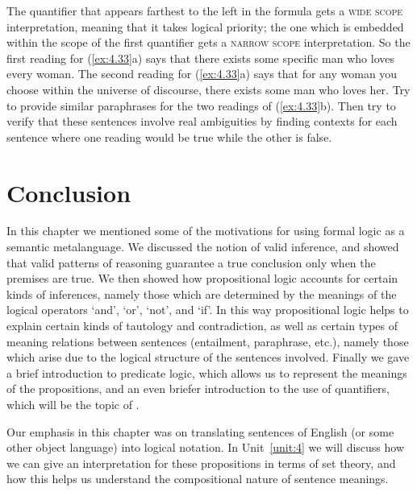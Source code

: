 The quantifier that appears farthest to the left in the formula gets a \textsc{wide scope} interpretation, meaning that it takes logical priority; the one which is embedded within the scope of the first quantifier gets a \textsc{narrow scope} interpretation. So the first reading for (\ref{ex:4.33}a) says that there exists some specific man who loves every woman. The second reading for (\ref{ex:4.33}a) says that for any woman you choose within the universe of discourse, there exists some man who loves her. Try to provide similar paraphrases for the two readings of (\ref{ex:4.33}b). Then try to verify that these sentences involve real ambiguities by finding contexts for each sentence where one reading would be true while the other is false.


\section{Conclusion}\label{sec:4.5}

In this chapter we mentioned some of the motivations for using formal logic as a semantic metalanguage. We discussed the notion of valid inference, and showed that valid patterns of reasoning guarantee a true conclusion only when the premises are true. We then showed how propositional logic accounts for certain kinds of inferences, namely those which are determined by the meanings of the logical operators ‘and’, ‘or’, ‘not’, and ‘if’. In this way propositional logic helps to explain certain kinds of tautology and contradiction, as well as certain types of meaning relations between sentences (entailment, paraphrase, etc.), namely those which arise due to the logical structure of the sentences involved. Finally we gave a brief introduction to predicate logic, which allows us to represent the meanings of the propositions, and an even briefer introduction to the use of quantifiers, which will be the topic of .



Our emphasis in this chapter was on translating sentences of English (or some other object language) into logical notation. In Unit~\ref{unit:4} we will discuss how we can give an interpretation for these propositions in terms of set theory, and how this helps us understand the compositional nature of sentence meanings.





